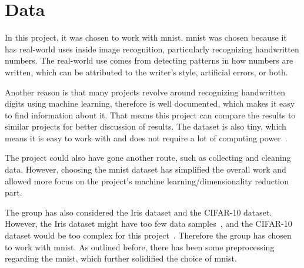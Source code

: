 \section{Data}\label{sec:data}
In this project, it was chosen to work with \gls{mnist}. \gls{mnist} was chosen because it has real-world uses inside image recognition, particularly recognizing handwritten numbers. The real-world use comes from detecting patterns in how numbers are written, which can be attributed to the writer's style, artificial errors, or both. 

Another reason is that many projects revolve around recognizing handwritten digits using machine learning, therefore is well documented, which makes it easy to find information about it. That means this project can compare the results to similar projects for better discussion of results. The dataset is also tiny, which means it is easy to work with and does not require a lot of computing power~\cite{lecun-mnist-database}.

The project could also have gone another route, such as collecting and cleaning data. However, choosing the \gls{mnist} dataset has simplified the overall work and allowed more focus on the project's machine learning/dimensionality reduction part. 

The group has also considered the Iris dataset and the CIFAR-10 dataset. However, the Iris dataset might have too few data samples~\cite{mnist-vs-iris}, and the CIFAR-10 dataset would be too complex for this project~\cite{datasets-uniqtech}. Therefore the group has chosen to work with \gls{mnist}. As outlined before, there has been some preprocessing regarding the \gls{mnist}, which further solidified the choice of \gls{mnist}.





